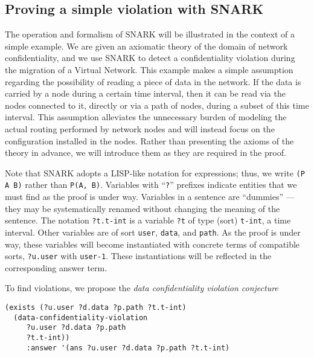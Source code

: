 
\subsection{Proving a simple violation with SNARK}
\label{sec:find-violation}
The operation and formalism of SNARK will be illustrated in the context of a simple example.
We are given an axiomatic theory of the domain of network confidentiality, and we use SNARK to detect a confidentiality violation during the migration of a Virtual Network.
This example makes a simple assumption regarding the possibility of reading a piece of data in the network. If the data is carried by a node during a certain time interval, then it can be read via the nodes connected to it, directly or via a path of nodes, during a subset of this time interval.
This assumption alleviates the unnecessary burden of modeling the actual routing performed by network nodes and will instead focus on the configuration installed in the nodes.
Rather than presenting the axioms of the theory in advance, we will introduce them as they are required in the proof.

Note that SNARK adopts a LISP-like notation for expressions; thus, we write \verb'(P A B)' rather than \verb'P(A, B)'. 
Variables with ``\verb'?''' prefixes indicate entities that we must find as the proof is under way.
Variables in a sentence are ``dummies'' \---- they may be systematically renamed without changing the meaning of the sentence. 
The notation \verb'?t.t-int' is a variable \verb'?t' of type (sort) \verb't-int', \ie a time interval. 
Other variables are of sort \verb'user', \verb'data', and \verb'path'.
As the proof is under way, these variables will become instantiated with concrete terms of compatible sorts, \eg \verb'?u.user' with \verb'user-1'. 
These instantiations will be reflected in the corresponding answer term.

To find violations, we propose the \textit{data confidentiality violation conjecture}

\begin{lstlisting}[numbers=none] 
(exists (?u.user ?d.data ?p.path ?t.t-int)
  (data-confidentiality-violation 
     ?u.user ?d.data ?p.path 
     ?t.t-int))
     :answer '(ans ?u.user ?d.data ?p.path ?t.t-int)
\end{lstlisting}

